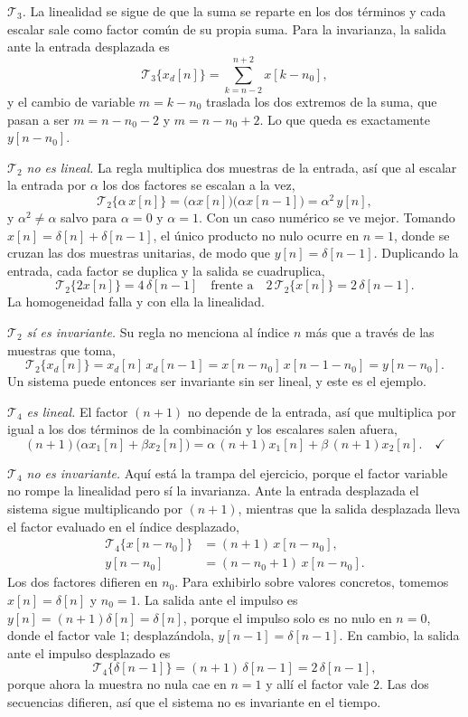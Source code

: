 \documentclass[10pt,a4paper]{article}
\begin{document}
\begin{enumerate}
		\emph{$\mathcal{T}_3$.} La linealidad se sigue de que la suma se reparte en los dos
		términos y cada escalar sale como factor común de su propia suma. Para la invarianza,
		la salida ante la entrada desplazada es
		\[
			\mathcal{T}_3\{x_d[n]\} = \sum_{k=n-2}^{n+2} x[k-n_0],
		\]
		y el cambio de variable $m=k-n_0$ traslada los dos extremos de la suma, que pasan a
		ser $m=n-n_0-2$ y $m=n-n_0+2$. Lo que queda es exactamente $y[n-n_0]$.

		\emph{$\mathcal{T}_2$ no es lineal.} La regla multiplica dos muestras de la entrada,
		así que al escalar la entrada por $\alpha$ los dos factores se escalan a la vez,
		\[
			\mathcal{T}_2\{\alpha\,x[n]\} = \bigl(\alpha x[n]\bigr)\bigl(\alpha x[n-1]\bigr)
			= \alpha^2\,y[n],
		\]
		y $\alpha^2 \neq \alpha$ salvo para $\alpha=0$ y $\alpha=1$. Con un caso numérico se
		ve mejor. Tomando $x[n]=\delta[n]+\delta[n-1]$, el único producto no nulo ocurre en
		$n=1$, donde se cruzan las dos muestras unitarias, de modo que $y[n]=\delta[n-1]$.
		Duplicando la entrada, cada factor se duplica y la salida se cuadruplica,
		\[
			\mathcal{T}_2\{2x[n]\} = 4\,\delta[n-1]
			\quad\text{frente a}\quad
			2\,\mathcal{T}_2\{x[n]\} = 2\,\delta[n-1].
		\]
		La homogeneidad falla y con ella la linealidad.

		\emph{$\mathcal{T}_2$ sí es invariante.} Su regla no menciona al índice $n$ más que a
		través de las muestras que toma,
		\[
			\mathcal{T}_2\{x_d[n]\} = x_d[n]\,x_d[n-1] = x[n-n_0]\,x[n-1-n_0] = y[n-n_0].
		\]
		Un sistema puede entonces ser invariante sin ser lineal, y este es el ejemplo.

		\emph{$\mathcal{T}_4$ es lineal.} El factor $(n+1)$ no depende de la entrada, así que
		multiplica por igual a los dos términos de la combinación y los escalares salen
		afuera,
		\[
			(n+1)\bigl(\alpha x_1[n]+\beta x_2[n]\bigr)
			= \alpha\,(n+1)x_1[n] + \beta\,(n+1)x_2[n]. \quad\checkmark
		\]

		\emph{$\mathcal{T}_4$ no es invariante.} Aquí está la trampa del ejercicio, porque el
		factor variable no rompe la linealidad pero sí la invarianza. Ante la entrada
		desplazada el sistema sigue multiplicando por $(n+1)$, mientras que la salida
		desplazada lleva el factor evaluado en el índice desplazado,
		\[
			\begin{aligned}
			\mathcal{T}_4\{x[n-n_0]\} &= (n+1)\,x[n-n_0], \\
			y[n-n_0] &= (n-n_0+1)\,x[n-n_0].
			\end{aligned}
		\]
		Los dos factores difieren en $n_0$. Para exhibirlo sobre valores concretos, tomemos
		$x[n]=\delta[n]$ y $n_0=1$. La salida ante el impulso es
		$y[n]=(n+1)\delta[n]=\delta[n]$, porque el impulso solo es no nulo en $n=0$, donde el
		factor vale $1$; desplazándola, $y[n-1]=\delta[n-1]$. En cambio, la salida ante el
		impulso desplazado es
		\[
			\mathcal{T}_4\{\delta[n-1]\} = (n+1)\,\delta[n-1] = 2\,\delta[n-1],
		\]
		porque ahora la muestra no nula cae en $n=1$ y allí el factor vale $2$. Las dos
		secuencias difieren, así que el sistema no es invariante en el tiempo.


\end{enumerate}
\end{document}
